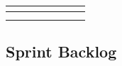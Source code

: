 \documentclass{scrartcl}
\begin{document}
\begin{table}[]
\begin{tabular}{l|l|l|l|l|l|l|l}
  \multicolumn{1}{|l|}{} &            &                          &          &                                                               &                                                                 &                                                                & \multicolumn{1}{l|}{} \\ \hline
  \multicolumn{1}{|l|}{} &            &                          &          &                                                               &                                                                 &                                                                & \multicolumn{1}{l|}{} \\ \hline
  \multicolumn{1}{|l|}{} &            &                          &          &                                                               &                                                                 &                                                                & \multicolumn{1}{l|}{} \\ \hline
  \end{tabular}
\end{table}

\subsection{Sprint Backlog}
\end{document}
